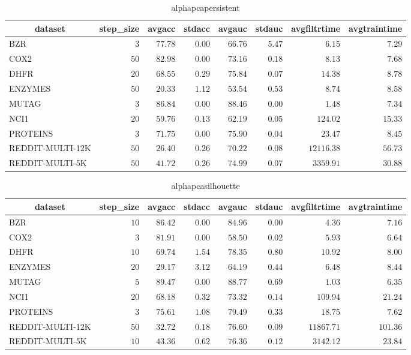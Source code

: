 \begin{table}[!tbp]
\caption{alphapcapersistent\label{alphapcapersistent}} 
{\centering
\begin{tabular}{lrrrrrrr}
\hline\hline
\multicolumn{1}{c}{dataset}&\multicolumn{1}{c}{step_size}&\multicolumn{1}{c}{avgacc}&\multicolumn{1}{c}{stdacc}&\multicolumn{1}{c}{avgauc}&\multicolumn{1}{c}{stdauc}&\multicolumn{1}{c}{avgfiltrtime}&\multicolumn{1}{c}{avgtraintime}\tabularnewline
\hline
BZR&$ 3$&$77.78$&$0.00$&$66.76$&$5.47$&$    6.15$&$ 7.29$\tabularnewline
COX2&$50$&$82.98$&$0.00$&$73.16$&$0.18$&$    8.13$&$ 7.68$\tabularnewline
DHFR&$20$&$68.55$&$0.29$&$75.84$&$0.07$&$   14.38$&$ 8.78$\tabularnewline
ENZYMES&$50$&$20.33$&$1.12$&$53.54$&$0.53$&$    8.74$&$ 8.58$\tabularnewline
MUTAG&$ 3$&$86.84$&$0.00$&$88.46$&$0.00$&$    1.48$&$ 7.34$\tabularnewline
NCI1&$20$&$59.76$&$0.13$&$62.19$&$0.05$&$  124.02$&$15.33$\tabularnewline
PROTEINS&$ 3$&$71.75$&$0.00$&$75.90$&$0.04$&$   23.47$&$ 8.45$\tabularnewline
REDDIT-MULTI-12K&$50$&$26.40$&$0.26$&$70.22$&$0.08$&$12116.38$&$56.73$\tabularnewline
REDDIT-MULTI-5K&$50$&$41.72$&$0.26$&$74.99$&$0.07$&$ 3359.91$&$30.88$\tabularnewline
\hline
\end{tabular}}
\end{table}
\begin{table}[!tbp]
\caption{alphapcasilhouette\label{alphapcasilhouette}} 
{\centering
\begin{tabular}{lrrrrrrr}
\hline\hline
\multicolumn{1}{c}{dataset}&\multicolumn{1}{c}{step_size}&\multicolumn{1}{c}{avgacc}&\multicolumn{1}{c}{stdacc}&\multicolumn{1}{c}{avgauc}&\multicolumn{1}{c}{stdauc}&\multicolumn{1}{c}{avgfiltrtime}&\multicolumn{1}{c}{avgtraintime}\tabularnewline
\hline
BZR&$10$&$86.42$&$0.00$&$84.96$&$0.00$&$    4.36$&$  7.16$\tabularnewline
COX2&$ 3$&$81.91$&$0.00$&$58.50$&$0.02$&$    5.93$&$  6.64$\tabularnewline
DHFR&$10$&$69.74$&$1.54$&$78.35$&$0.80$&$   10.92$&$  8.00$\tabularnewline
ENZYMES&$20$&$29.17$&$3.12$&$64.19$&$0.44$&$    6.48$&$  8.44$\tabularnewline
MUTAG&$ 5$&$89.47$&$0.00$&$88.77$&$0.69$&$    1.03$&$  6.35$\tabularnewline
NCI1&$20$&$68.18$&$0.32$&$73.32$&$0.14$&$  109.94$&$ 21.24$\tabularnewline
PROTEINS&$ 3$&$75.61$&$1.08$&$79.49$&$0.33$&$   18.75$&$  7.62$\tabularnewline
REDDIT-MULTI-12K&$50$&$32.72$&$0.18$&$76.60$&$0.09$&$11867.71$&$101.36$\tabularnewline
REDDIT-MULTI-5K&$10$&$43.36$&$0.62$&$76.36$&$0.12$&$ 3142.12$&$ 23.84$\tabularnewline
\hline
\end{tabular}}
\end{table}
